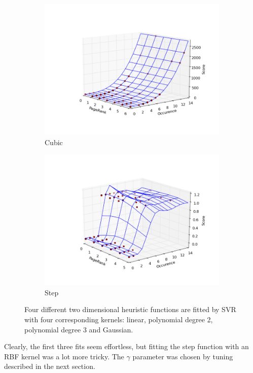 \documentclass[12pt,notitlepage,twoside]{scrreprt}
\begin{document}
\begin{figure}[h!]
\begin{subfigure}[b]{.49\textwidth}
  \centering
  \includegraphics[width=\linewidth]{figs/cub.png}
  \caption{Cubic}
  \label{cubic}
\end{subfigure}
\begin{subfigure}[b]{.49\textwidth}
  \centering
  \includegraphics[width=\linewidth]{figs/step.png}
  \caption{Step}
  \label{step}
\end{subfigure}
\caption{Four different two dimensional heuristic functions are fitted by SVR with four
	corresponding kernels: linear, polynomial degree 2, polynomial degree 3 and Gaussian.\label{kernels}}
\end{figure}
Clearly, the first three fits seem effortless, but fitting the step function with an RBF
kernel was a lot more tricky. The $\gamma$ parameter was chosen by tuning described in the
next section.
\end{document}
